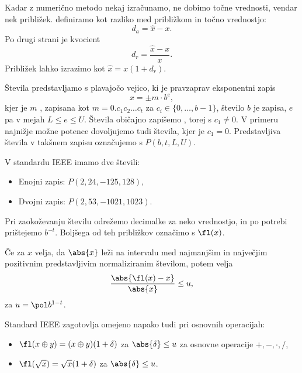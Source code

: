 
Kadar z numerično metodo nekaj izračunamo, ne dobimo točne vrednosti, vendar nek
približek.
 definiramo kot razliko med približkom in točno
vrednostjo:
\[
  d_a = \hat{x} - x.
\]
Po drugi strani je  kvocient
\[
  d_r = \frac{\hat{x} - x}{x}.
\]
Približek lahko izrazimo kot $\hat{x} = x (1 + d_r)$.


Števila predstavljamo s plavajočo vejico, ki je pravzaprav eksponentni zapis
\[
  x = \pm m \cdot b^e,
\]
kjer je $m$ , zapisana kot $m = 0.c_1c_2\ldots c_t$ za $c_i \in
\{0, \ldots, b-1\}$, število $b$ je  zapisa, $e$ pa
 v mejah $L \le e \le U$.
Števila običajno zapišemo , torej s $c_1 \ne 0$.
V primeru najnižje možne potence dovoljujemo tudi 
števila, kjer je $c_1 = 0$.
Predstavljiva števila v takšnem zapisu označujemo s $P(b, t, L, U)$.

V standardu IEEE imamo dve števili:
\begin{itemize}
\item Enojni zapis: $P(2, 24, -125, 128)$,
\item Dvojni zapis: $P(2, 53, -1021, 1023)$.
\end{itemize}


Pri zaokoževanju številu odrežemo decimalke za neko vrednostjo, in po potrebi
prištejemo $b^{-t}$.
Boljšega od teh približkov označimo s $\fl(x)$.

\begin{izrek}
  Če za $x$ velja, da $\abs{x}$ leži na intervalu med najmanjšim in največjim
  pozitivnim predstavljivim normaliziranim številom, potem velja
  \[
    \frac{\abs{\fl(x) - x}}{\abs{x}} \le u,
  \]
  za  $u = \pol b^{1-t}$.
\end{izrek}


Standard IEEE zagotovlja omejeno napako tudi pri osnovnih operacijah:
\begin{itemize}
\item $\fl(x \oplus y) = (x \oplus y) (1 + \delta)$ za $\abs{\delta} \le u$ za
  osnovne operacije $+, -, \cdot, /$,
\item $\fl(\sqrt{x}) = \sqrt{x} (1 + \delta)$ za $\abs{\delta} \le u$.
\end{itemize}

